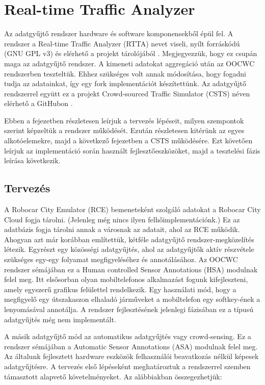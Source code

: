 \documentclass[a4paper,12pt]{report}
\begin{document}
\chapter{Real-time Traffic Analyzer}
\label{rttachapter}

Az adatgyűjtő rendszer hardware és software komponensekből épül fel. A rendszer a Real-time Traffic Analyzer (RTTA) nevet viseli, nyílt forráskódú (GNU GPL v3) és elérhető a projekt tárolójából \cite{rtta}. Megjegyezzük, hogy ez csupán maga az adatgyűjtő rendszer. A kimeneti adatokat aggregáció után az OOCWC rendszerben teszteltük. Ehhez szükséges volt annak módosítása, hogy fogadni tudja az adatainkat, így egy fork implementációt készítettünk. Az adatgyűjtő rendszerrel együtt ez a projekt Crowd-sourced Traffic Simulator (CSTS) néven elérhető a GitHubon \cite{csts}. 

Ebben a fejezetben részletesen leírjuk a tervezés lépéseit, milyen szempontok szerint képzeltük a rendszer működését. Ezután részletesen kitérünk az egyes alkotóelemekre, majd a következő fejezetben a CSTS működésére. Ezt követően leírjuk az implementáció során használt fejlesztőeszközöket, majd a tesztelési fázis leírása következik.

\section{Tervezés}
\label{tervezes}

A Robocar City Emulator (RCE) bemeneteként szolgáló adatokat a Robocar City Cloud fogja tárolni. (Jelenleg még nincs ilyen felhőimplementációnk.) Ez az adatbázis fogja tárolni annak a városnak az adatait, ahol az RCE működik. Ahogyan azt már korábban említettük, kétféle adatgyűjtő rendszer-megközelítés létezik. Egyrészt egy közösségi adatgyűjtés, ahol az adatgyűjtők aktív részvétele szükséges egy-egy folyamat megfigyeléséhez és annotálásához. Az OOCWC rendszer sémájában ez a Human controlled Sensor Annotations (HSA) modulnak felel meg. Itt elsősorban olyan mobiltelefonos alkalmazást fogunk kifejleszteni, amely egyszerű grafikus felülettel rendelkezik. Egy használati mód, hogy a megfigyelő egy útszakaszon elhaladó járműveket a mobiltelefon egy softkey-ének a lenyomásával annotálja. A rendszer fejlesztésének jelenlegi fázisában ez a típusú adatgyűjtés még nem implementált.

A másik adatgyűjtő mód az automatikus adatgyűjtés vagy crowd-sensing. Ez a rendszer sémájában a Automatic Sensor Annotations (ASA) modulnak felel meg. Az általunk fejlesztett hardware eszközök felhasználói beavatkozás nélkül képesek adatgyűjtésre. A tervezés első lépéseként meghatároztuk a rendszerrel szemben támasztott alapvető követelményeket. Az alábbiakban összegezhetjük:
\end{document}
